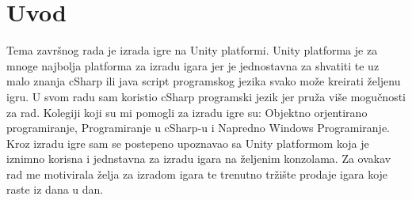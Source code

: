 \section{Uvod}
Tema završnog rada je izrada igre na Unity platformi. Unity platforma je za mnoge najbolja platforma za izradu igara jer je jednostavna za shvatiti te uz malo znanja cSharp ili java script programskog jezika svako može kreirati željenu igru. U svom radu sam koristio cSharp programski jezik jer pruža više mogučnosti za rad. Kolegiji koji su mi pomogli za izradu igre su: Objektno orjentirano programiranje, Programiranje u cSharp-u i Napredno Windows Programiranje.
Kroz izradu igre sam se postepeno upoznavao sa Unity platformom koja je iznimno korisna i jednstavna za izradu igara na željenim konzolama.
Za ovakav rad me motivirala želja za izradom igara te trenutno tržište prodaje igara koje raste iz dana u dan.